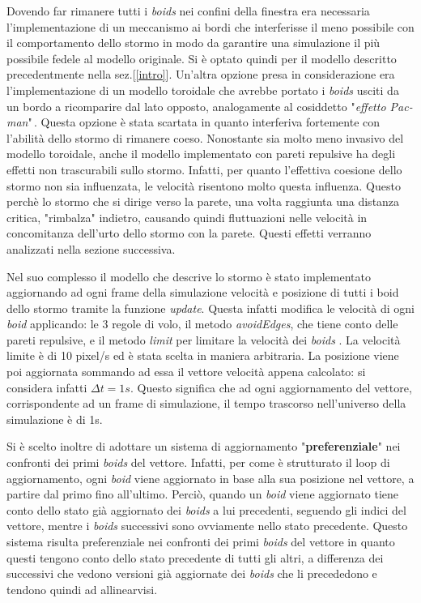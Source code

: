 \documentclass{article}
\begin{document}
Dovendo far rimanere tutti i \textit{boids} nei confini della finestra era necessaria l'implementazione di un meccanismo ai bordi che interferisse il meno possibile con il comportamento dello stormo in modo da garantire una simulazione il più possibile fedele al modello originale. Si è optato quindi per il modello descritto precedentmente nella sez.[\ref{intro}]. Un'altra opzione presa in considerazione era l'implementazione di un modello toroidale che avrebbe portato i \textit{boids} usciti da un bordo a ricomparire dal lato opposto, analogamente al cosiddetto "\textit{effetto Pac-man}"\,. Questa opzione è stata scartata in quanto interferiva fortemente con l'abilità dello stormo di rimanere coeso.
Nonostante sia molto meno invasivo del modello toroidale, anche il modello implementato con pareti repulsive ha degli effetti non trascurabili sullo stormo. Infatti, per quanto l'effettiva coesione dello stormo non sia influenzata, le velocità risentono molto questa influenza. Questo perchè lo stormo che si dirige verso la parete, una volta raggiunta una distanza critica, "rimbalza" indietro, causando quindi fluttuazioni nelle velocità in concomitanza dell'urto dello stormo con la parete. Questi effetti verranno analizzati nella sezione successiva.

Nel suo complesso il modello che descrive lo stormo è stato implementato aggiornando ad ogni frame della simulazione velocità e posizione di tutti i boid dello stormo tramite la funzione \textit{update}. Questa infatti modifica
le velocità di ogni \textit{boid} applicando: le 3 regole di volo, il metodo \textit{avoidEdges}, che tiene conto delle pareti repulsive, e il metodo \textit{limit} per limitare la velocità dei \textit{boids} . La velocità limite è di 10 pixel/s ed è stata scelta in maniera arbitraria. La posizione viene poi aggiornata sommando ad essa il vettore velocità appena calcolato: si considera infatti \(\Delta t = 1s\). Questo significa che ad ogni aggiornamento del vettore, corrispondente ad un frame di simulazione, il tempo trascorso nell'universo della simulazione è di 1s.


Si è scelto inoltre di adottare un sistema di aggiornamento "\textbf{preferenziale}" nei confronti dei primi \textit{boids} del vettore. Infatti, per come è strutturato il loop di aggiornamento, ogni \textit{boid} viene aggiornato in base alla sua posizione nel vettore, a partire dal primo fino all'ultimo. Perciò, quando un \textit{boid} viene aggiornato tiene conto dello stato già aggiornato dei \textit{boids} a lui precedenti, seguendo gli indici del vettore, mentre i \textit{boids} successivi sono ovviamente nello stato precedente. Questo sistema risulta preferenziale nei confronti dei primi \textit{boids} del vettore in quanto questi tengono conto dello stato precedente di tutti gli altri, a differenza dei successivi che vedono versioni già aggiornate dei \textit{boids} che li precededono e tendono quindi ad allinearvisi. 
\end{document}
